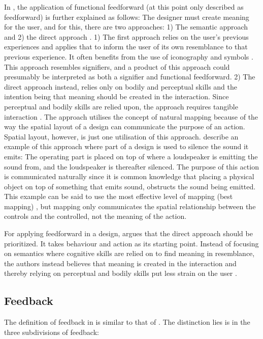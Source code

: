 In , the application of functional feedforward (at this point only described as feedforward) is further explained as follows: The designer must create meaning for the user, and for this, there are two approaches: 1) The semantic approach and 2) the direct approach \cite{howdonald}. 1) The first approach relies on the user's previous experiences and applies that to inform the user of its own resemblance to that previous experience. It often benefits from the use of iconography and symbols \cite{howdonald}. This approach resembles signifiers, and a product of this approach could presumably be interpreted as both a signifier and functional feedforward. 2) The direct approach instead, relies only on bodily and perceptual skills and the intention being that meaning should be created in the interaction. Since perceptual and bodily skills are relied upon, the approach requires tangible interaction \cite{howdonald}. The approach utilises the concept of natural mapping because of the way the spatial layout of a design can communicate the purpose of an action. Spatial layout, however, is just one utilisation of this approach.  describe an example of this approach where part of a design is used to silence the sound it emits: The operating part is placed on top of where a loudspeaker is emitting the sound from, and the loudspeaker is thereafter silenced. The purpose of this action is communicated naturally since it is common knowledge that placing a physical object on top of something that emits sound, obstructs the sound being emitted. This example can be said to use the most effective level of mapping (best mapping) \cite{norman}, but mapping only communicates the spatial relationship between the controls and the controlled, not the meaning of the action.

For applying feedforward in a design,  argues that the direct approach should be prioritized. It takes behaviour and action as its starting point. Instead of focusing on semantics where cognitive skills are relied on to find meaning in resemblance, the authors instead believes that meaning is created in the interaction and thereby relying on perceptual and bodily skills put less strain on the user \cite{frogger}.

\subsection{Feedback} The definition of feedback in  is similar to that of . The distinction lies is in the three subdivisions of feedback:

